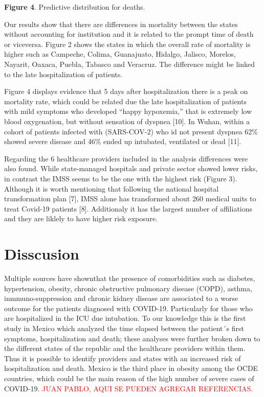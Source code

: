 \documentclass[10pt,letterpaper]{article}
\begin{document}
\textbf{Figure 4}. Predictive distribution for deaths.

Our results show that there are differences in mortality between the
states without accounting for institution and it is related to the
prompt time of death or viceversa. Figure 2 shows the states in which
the overall rate of mortality is higher such as Campeche, Colima,
Guanajuato, Hidalgo, Jalisco, Morelos, Nayarit, Oaxaca, Puebla, Tabasco
and Veracruz. The difference might be linked to the late hospitalization
of patients.

Figure 4 displays evidence that 5 days after hospitalization there is a
peak on mortality rate, which could be related due the late
hospitalization of patients with mild symptoms who developed ``happy
hypoxemia,'' that is extremely low blood oxygenation, but without
sensation of dyspnea {[}10{]}. In Wuhan, within a cohort of patients
infected with (SARS-COV-2) who id not present dyspnea 62\% showed severe
disease and 46\% ended up intubated, ventilated or dead {[}11{]}.

Regarding the 6 healthcare providers included in the analysis
differences were also found. While state-managed hospitals and private
sector showed lower risks, in contrast the IMSS seems to be the one with
the highest risk (Figure 3). Although it is worth mentioning that
following the national hospital transformation plan {[}7{]}, IMSS alone
has transformed about 260 medical units to treat Covid-19 patients
{[}8{]}. Additionaly it has the largest number of affiliations and they
are liklely to have higher risk exposure.

\section{Disscusion}\label{disscusion}

Multiple sources have shownthat the presence of comorbidities such as
diabetes, hypertension, obesity, chronic obstructive pulmonary disease
(COPD), asthma, inmmuno-suppression and chronic kidney disease are
associated to a worse outcome for the patients diagnosed with COVID-19.
Particularly for those who are hospitalized in the ICU due intubation.
To our knowledge this is the first study in Mexico which analyzed the
time elapsed between the patient´s first symptoms, hospitalization and
death; these analyses were further broken down to the different states
of the republic and the healthcare providers within them. Thus it is
possible to identify providers and states with an increased risk of
hospitalization and death. Mexico is the third place in obesity among
the OCDE countries, which could be the main reason of the high number of
severe cases of COVID-19.
\textcolor{red}{JUAN PABLO, AQUI SE PUEDEN AGREGAR REFERENCIAS.}
\end{document}
